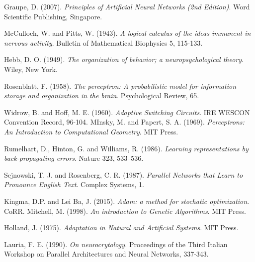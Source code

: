 \documentclass[%
    corpo=11pt,
    twoside,
    stile=classica,
    oldstyle,
    autoretitolo,
    tipotesi=magistrale,
    greek,
    evenboxes,
    english
]{toptesi}
\begin{document}





\begin{thebibliography}{99}

 {\sc Graupe, D.} (2007). \textit{Principles of Artificial Neural Networks (2nd Edition)}. Word Scientific Publishing, Singapore.
 
 {\sc McCulloch, W.} and {\sc Pitts, W}. (1943). \textit{A logical calculus of the ideas immanent in nervous activity}. Bulletin of Mathematical Biophysics 5, 115-133.

 {\sc Hebb, D. O.} (1949). \textit{The organization of behavior; a neuropsychological theory}. Wiley, New York.

 {\sc Rosenblatt, F.} (1958). \textit{The perceptron: A probabilistic model for information storage and organization in the brain}. Psychological Review, 65.

 {\sc Widrow, B.} and {\sc Hoff, M. E.} (1960). \textit{Adaptive Switching Circuits}. IRE WESCON Convention Record, 96-104.
 {\sc MInsky, M.} and {\sc Papert, S. A.} (1969). \textit{Perceptrons: An Introduction to Computational Geometry}. MIT Press.

 {\sc Rumelhart, D.}, {\sc Hinton, G.} and {\sc Williams, R.} (1986). \textit{Learning representations by back-propagating errors}. Nature 323, 533–536.

 {\sc Sejnowski, T. J.} and {\sc Rosenberg, C. R.} (1987). \textit{Parallel Networks that Learn to Pronounce English Text}. Complex Systems, 1.

 {\sc Kingma, D.P.} and {\sc Lei Ba, J.} (2015). \textit{Adam: a method for stochatic optimization}. CoRR.
 {\sc Mitchell, M.} (1998). \textit{An introduction to Genetic Algorithms}. MIT Press.

 {\sc Holland, J.} (1975). \textit{Adaptation in Natural and Artificial Systems}. MIT Press. 

 {\sc Lauria, F. E.} (1990). \textit{On neurocrytology.} Proceedings of the Third Italian Workshop on Parallel Architectures and Neural Networks, 337-343.


\end{thebibliography}
\end{document}
